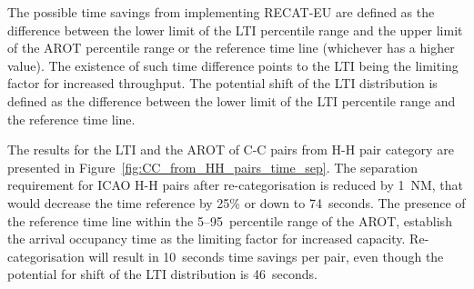 The possible time savings from implementing RECAT-EU are defined as the difference between the lower limit of the LTI percentile range and the upper limit of the AROT percentile range or the reference time line (whichever has a higher value). The existence of such time difference points to the LTI being the limiting factor for increased throughput. The potential shift of the LTI distribution is defined as the difference between the lower limit of the LTI percentile range and the reference time line.

The results for the LTI and the AROT of C-C pairs from H-H pair category are presented in Figure~\ref{fig:CC_from_HH_pairs_time_sep}. The separation requirement for ICAO H-H pairs after re-categorisation is reduced by 1~NM, that would decrease the time reference by 25\% or down to 74~seconds. The presence of the reference time line within the 5--95~percentile range of the AROT, establish the arrival occupancy time as the limiting factor for increased capacity. Re-categorisation will result in 10~seconds time savings per pair, even though the potential for shift of the LTI distribution is 46~seconds.

